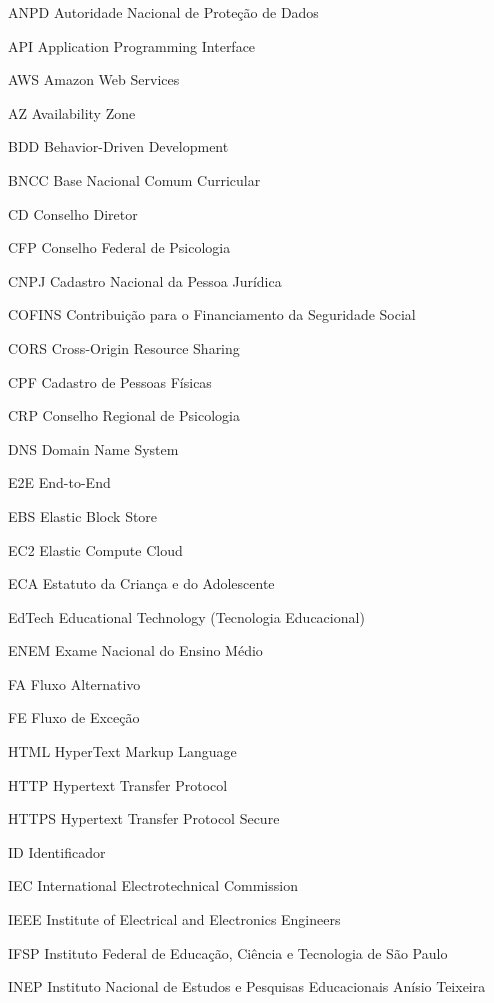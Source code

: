 \begin{siglas}
  \item[ANPD] Autoridade Nacional de Proteção de Dados
  \item[API] Application Programming Interface
  \item[AWS] Amazon Web Services
  \item[AZ] Availability Zone
  \item[BDD] Behavior-Driven Development
  \item[BNCC] Base Nacional Comum Curricular
  \item[CD] Conselho Diretor
  \item[CFP] Conselho Federal de Psicologia
  \item[CNPJ] Cadastro Nacional da Pessoa Jurídica
  \item[COFINS] Contribuição para o Financiamento da Seguridade Social
  \item[CORS] Cross-Origin Resource Sharing
  \item[CPF] Cadastro de Pessoas Físicas
  \item[CRP] Conselho Regional de Psicologia
  \item[DNS] Domain Name System
  \item[E2E] End-to-End
  \item[EBS] Elastic Block Store
  \item[EC2] Elastic Compute Cloud
  \item[ECA] Estatuto da Criança e do Adolescente
  \item[EdTech] Educational Technology (Tecnologia Educacional)
  \item[ENEM] Exame Nacional do Ensino Médio
  \item[FA] Fluxo Alternativo
  \item[FE] Fluxo de Exceção
  \item[HTML] HyperText Markup Language
  \item[HTTP] Hypertext Transfer Protocol
  \item[HTTPS] Hypertext Transfer Protocol Secure
  \item[ID] Identificador
  \item[IEC] International Electrotechnical Commission
  \item[IEEE] Institute of Electrical and Electronics Engineers
  \item[IFSP] Instituto Federal de Educação, Ciência e Tecnologia de São Paulo
  \item[INEP] Instituto Nacional de Estudos e Pesquisas Educacionais Anísio Teixeira

\end{siglas}
